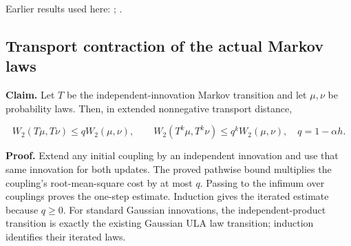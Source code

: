 \documentclass[11pt,a4paper]{report}
\begin{document}
Earlier results used here: \cite[Section~3.10.7]{LangevinLean2026ULASC}; \cite[Section~3.34.1]{LangevinLean2026ULASC}.
\subsection{\texorpdfstring{Transport contraction of the actual Markov laws}{Transport contraction of the actual Markov laws}}
\label{report-step-WassersteinMixing-Transport-lean-2}


\textbf{Claim.} Let \(T\) be the independent-innovation Markov transition and let \(\mu,\nu\) be probability laws. Then, in extended nonnegative transport distance,

\[W_2(T\mu,T\nu)\le qW_2(\mu,\nu),\qquad
W_2(T^k\mu,T^k\nu)\le q^kW_2(\mu,\nu),\quad q=1-\alpha h.\]


\textbf{Proof.} Extend any initial coupling by an independent innovation and use that same innovation for both updates. The proved pathwise bound multiplies the coupling's root-mean-square cost by at most \(q\). Passing to the infimum over couplings proves the one-step estimate. Induction gives the iterated estimate because \(q\ge0\). For standard Gaussian innovations, the independent-product transition is exactly the existing Gaussian ULA law transition; induction identifies their iterated laws.
\end{document}
